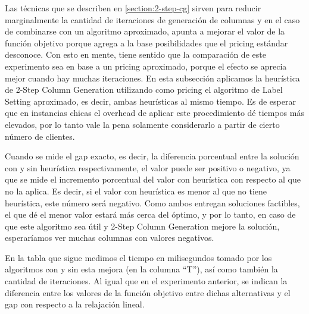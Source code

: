 Las técnicas que se describen en \ref{section:2-step-cg} sirven para reducir marginalmente la cantidad de iteraciones de generación de columnas y en el caso de combinarse con un algoritmo aproximado, apunta a mejorar el valor de la función objetivo porque agrega a la base posibilidades que el pricing estándar desconoce. Con esto en mente, tiene sentido que la comparación de este experimento sea en base a un pricing aproximado, porque el efecto se aprecia mejor cuando hay muchas iteraciones. En esta subsección aplicamos la heurística de 2-Step Column Generation utilizando como pricing el algoritmo de Label Setting aproximado, es decir, ambas heurísticas al mismo tiempo. Es de esperar que en instancias chicas el overhead de aplicar este procedimiento dé tiempos más elevados, por lo tanto vale la pena solamente considerarlo a partir de cierto número de clientes. 

Cuando se mide el gap exacto, es decir, la diferencia porcentual entre la solución con y sin heurística respectivamente, el valor puede ser positivo o negativo, ya que se mide el incremento porcentual del valor con heurística con respecto al que no la aplica. Es decir, si el valor con heurística es menor al que no tiene heurística, este número será negativo. Como ambos entregan soluciones factibles, el que dé el menor valor estará más cerca del óptimo, y por lo tanto, en caso de que este algoritmo sea útil y 2-Step Column Generation mejore la solución, esperaríamos ver muchas columnas con valores negativos.

En la tabla que sigue medimos el tiempo en milisegundos tomado por los algoritmos con y sin esta mejora (en la columna ``T''), así como también la cantidad de iteraciones. Al igual que en el experimento anterior, se indican la diferencia entre los valores de la función objetivo entre dichas alternativas y el gap con respecto a la relajación lineal. 


